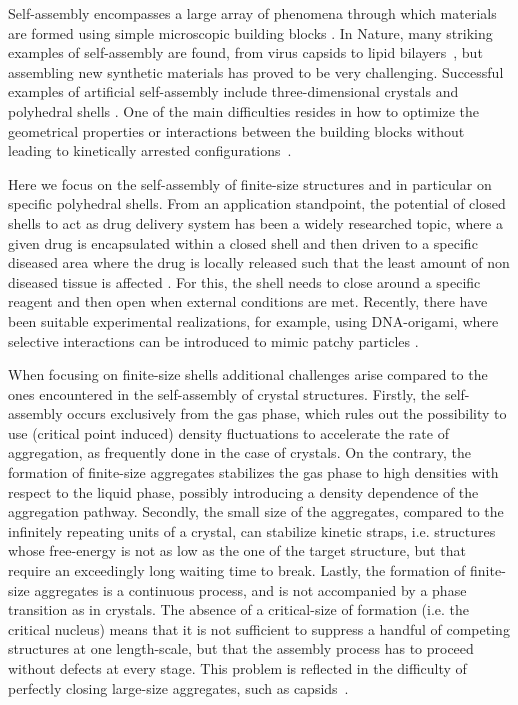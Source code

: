 \documentclass[a4paper, amsfonts, amssymb, amsmath, reprint, showkeys, nofootinbib, oneside]{revtex4-1}
\begin{document}
Self-assembly encompasses a large array of phenomena through which materials are formed using simple microscopic building blocks \cite{Whitelam2015}. In Nature, many striking examples of self-assembly are found, from virus capsids to lipid bilayers~\cite{Whitesides2002, Parnell2015, Teyssier2015}, but assembling new synthetic materials has proved to be very challenging. Successful examples of artificial self-assembly include three-dimensional crystals and polyhedral shells \cite{Dziomkina2005, Glotzer2007, Kim2011, LaCour2022,  McGorty2010, Mu2022, Nykypanchuk2008, Sacanna2011, Wang2012, Wang2015, Joshi2016,Bishop2022,Reguera2019, McMullen2022}. One of the main difficulties resides in how to optimize the geometrical properties or interactions between the building blocks without leading to  kinetically arrested configurations~\cite{Frenkel2011, Lash2015, Blaaderen2006, Meulen2015}.

Here we focus on the self-assembly of finite-size structures and in particular on specific polyhedral shells. 
From an application standpoint, the potential of closed shells to act as drug delivery system has been a widely researched topic, where a given drug is encapsulated within a closed shell and then driven to a specific diseased area where the drug is locally released such that the least amount of non diseased tissue is affected \cite{Huang2007, Uchida2007}. For this, the shell needs to close around a specific reagent and then open when external conditions are met. Recently, there have been suitable experimental realizations, for example, using DNA-origami, where selective interactions can be introduced to mimic patchy particles \cite{Mosayebi2017, Lee2022, Jun2021, Rothemund2006}.

When focusing on finite-size shells additional challenges arise compared to the ones encountered in the self-assembly of crystal structures. Firstly, the self-assembly occurs exclusively from the gas phase, which rules out the possibility to use (critical point induced) density fluctuations to accelerate the rate of aggregation, as frequently done in the case of crystals. On the contrary, the formation of finite-size aggregates stabilizes the gas phase to high densities with respect to the liquid phase, possibly introducing a density dependence of the aggregation pathway. Secondly, the small size of the aggregates, compared to the infinitely repeating units of a crystal, can stabilize kinetic straps, i.e. structures whose free-energy is not as low as the one of the target structure, but that require an exceedingly long waiting time to break. Lastly, the formation of finite-size aggregates is a continuous process, and is not accompanied by a phase transition as in crystals. The absence of a critical-size of formation (i.e. the critical nucleus) means that it is not sufficient to suppress a handful of competing structures at one length-scale, but that the assembly process has to proceed without defects at every stage. This problem is reflected in the difficulty of perfectly closing large-size aggregates, such as capsids~\cite{Mosayebi2017}.
\end{document}
